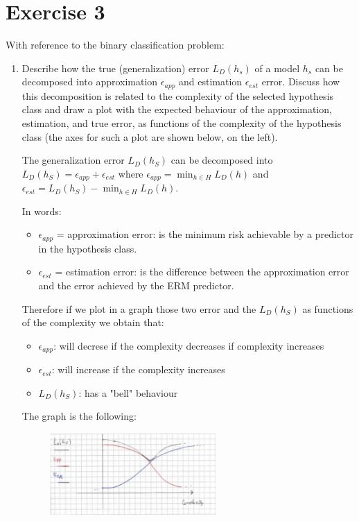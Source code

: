 \documentclass[a4paper,11pt,oneside]{book}
\begin{document}
\section{Exercise 3}
With reference to the binary classification problem:
\begin{enumerate}
\item Describe how the true (generalization) error $L_D(h_s)$ of a model $h_s$ can be decomposed into approximation $\epsilon_{app}$ and estimation $\epsilon_{est}$ error. Discuss how this decomposition is related to the complexity of the selected hypothesis class and draw a plot with the expected behaviour of the approximation, estimation, and true error, as functions of the complexity of the hypothesis class (the axes for such a plot are shown below, on the left).
    \begin{solution}
        The generalization error $L_D(h_S)$ can be decomposed into $L_D(h_S) = \epsilon_{app} + \epsilon_{est}$ where $\epsilon_{app} = \min_{h\in H}L_D(h)$ and $\epsilon_{est} = L_D(h_S) - \min_{h\in H}L_D(h)$.
        
        In words:
        \begin{itemize}
        \item $\epsilon_{app}$ = approximation error: is the minimum risk achievable by a predictor in the hypothesis class.
        \item $\epsilon_{est}$ = estimation error: is the difference between the approximation error and the error achieved by the ERM predictor.
        \end{itemize}
        
        Therefore if we plot in a graph those two error and the $L_D(h_S)$ as functions of the complexity we obtain that:
        \begin{itemize}
        \item $\epsilon_{app}$: will decrese if the complexity decreases if complexity increases
        \item $\epsilon_{est}$: will increase if the complexity increases  
        \item $L_D(h_S)$: has a "bell" behaviour
        \end{itemize}
        
        The graph is the following:
        
        \begin{figure}[H]
            \centering
            \includegraphics[width=0.6\textwidth,height=0.6\textheight,keepaspectratio]{images/1_3_6_Jul_2021.png}
         \end{figure}
        

\end{solution}
\end{enumerate}
\end{document}
